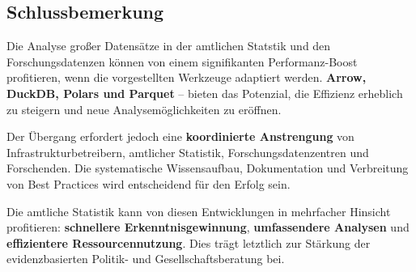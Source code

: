 \documentclass[
  german,
  10pt,
  twoside]{article}
\begin{document}
\subsection{Schlussbemerkung}\label{schlussbemerkung}

Die Analyse großer Datensätze in der amtlichen Statstik und den
Forschungsdatenzen können von einem signifikanten Performanz-Boost
profitieren, wenn die vorgestellten Werkzeuge adaptiert werden.
\textbf{Arrow, DuckDB, Polars und Parquet} -- bieten das Potenzial, die
Effizienz erheblich zu steigern und neue Analysemöglichkeiten zu
eröffnen.

Der Übergang erfordert jedoch eine \textbf{koordinierte Anstrengung} von
Infrastrukturbetreibern, amtlicher Statistik, Forschungsdatenzentren und
Forschenden. Die systematische Wissensaufbau, Dokumentation und
Verbreitung von Best Practices wird entscheidend für den Erfolg sein.

Die amtliche Statistik kann von diesen Entwicklungen in mehrfacher
Hinsicht profitieren: \textbf{schnellere Erkenntnisgewinnung},
\textbf{umfassendere Analysen} und \textbf{effizientere
Ressourcennutzung}. Dies trägt letztlich zur Stärkung der
evidenzbasierten Politik- und Gesellschaftsberatung bei.


\printbibliography
\end{document}
